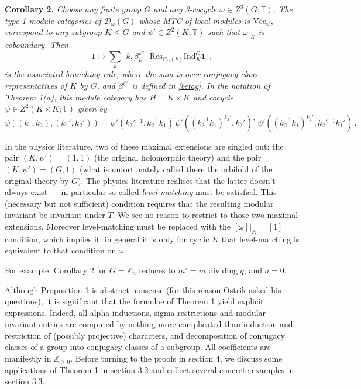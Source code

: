 \documentclass[12pt]{article}
\numberwithin{equation}{section}
\def\cD            {{\mathcal{D}}}
\def\bbC           {\mathbb{C}}
\def\bbT           {\mathbb{T}}
\def\bbZ           {\mathbb{Z}}
\begin{document}
\medskip\noindent\textbf{Corollary 2.} \textit{Choose any finite group $G$ and any 3-cocycle $\omega\in Z^3(G;\bbT)$. The type 1 module categories  of $\cD_\omega(G)$ 
whose MTC of local modules is $\mathrm{Vec}_\bbC$, correspond to any subgroup  $K\le G$ and  $\psi'\in Z^2(K;\bbT)$ such that ${\omega}|_{K}$  is coboundary. Then
\begin{equation}1\mapsto\sum_k\,\bigl[k,\beta^{\psi'}_k\cdot\mathrm{Res}_{C_G(k)}\mathrm{Ind}_K^G\mathbf{1}\bigr]\,,\end{equation}
is  the associated branching rule, where the sum is over conjugacy class representatives of $K$ by $G$, and $\beta^{\psi'}$ is defined in \eqref{betag}. In the notation of Theorem 1(a), this module category
has $H=K\times K$ and cocycle $\psi\in Z^2(K\times K;\bbT)$  given by} 
\begin{equation}\psi((k_1,k_2),(k_1',k_2'))=\psi'(k_2'{}^{-1},k_2^{-1}k_1)\,\psi'((k_2^{-1}k_1)^{k_2'},k_2'){}^*\,\psi'((k_2^{-1}k_1)^{k_2'},k_2'{}^{-1}k_1')\,.\end{equation}


In the physics literature, two of these maximal extensions are
singled out: the pair $(K,\psi')=(1,1)$ (the original holomorphic theory) and the pair $(K,\psi')=(G,1)$ (what is unfortunately called there the orbifold of the original theory by $G$). The physics literature realises that
the latter doesn't always exist --- in particular so-called \textit{level-matching} must be satisfied. This (necessary but not sufficient) condition requires that the resulting modular invariant be invariant under $T$. We see no reason to restrict to those two maximal extensions. Moreover level-matching must be replaced with the $[{\omega}]|_K=[1]$ condition, which implies it; in general it is only  for cyclic $K$
that level-matching is equivalent to that  condition  on $\widetilde{\omega}$.

For example, Corollary 2 for $G=\bbZ_n$ reduces to $m'=m$ dividing $q$, and $a=0$.


{Although Proposition 1 is abstract nonsense (for this reason Ostrik asked his questions), it is significant that the formulae of Theorem 1} 
yield explicit expressions. Indeed, all alpha-inductions, sigma-restrictions and modular invariant entries are computed by nothing more complicated than induction and restriction of (possibly projective) characters, and decomposition of conjugacy classes of a group into conjugacy classes of a subgroup. All coefficients are manifestly in $\bbZ_{\ge 0}$. Before turning to the proofs in section 4, we discuss  some applications of Theorem 1 in section 3.2 and collect several concrete examples  in section 3.3. 
\end{document}
